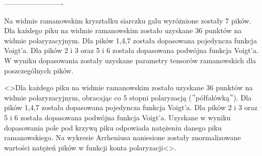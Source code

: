 -------------------------

Na widmie ramanowskim kryształku siarczku galu wyróżnione zostały 7 pików. Dla każdego piku na widmie ramanowskim zostało uzyskane 36 punktów na widmie polaryzacyjnym. Dla pików 1,4,7 została dopasowana pojedyncza funkcja Voigt'a. Dla pików 2 i 3 oraz 5 i 6 została dopasowana podwójna funkcja Voigt'a. W wyniku dopasowania zostały uzyskane parametry tensorów ramanowskich dla poszczególnych pików. 

<>Dla każdego piku na widmie ramanowskim zostało uzyskane 36 punktów na widmie polaryzacyjnym, obracając co 5 stopni polaryzacją ($"$półfalówką$"$). Dla pików 1,4,7 została dopasowana pojedyncza funkcja Voigt'a. Dla pików 2 i 3 oraz 5 i 6 została dopasowana podwójna funkcja Voigt'a. Uzyskane w wyniku dopasowania pole pod krzywą piku odpowiada natężeniu danego piku ramanowskiego. Na wykresie Arrheniusa naniesione zostały znormalizowane wartości natężeń pików w funkcji konta polaryzacji<>.


